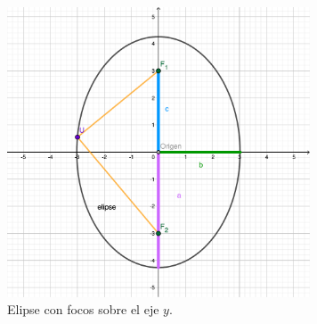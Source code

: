 \documentclass[letterpaper]{article}
\renewcommand{\*}{\cdot}
\theoremstyle{definition}
\begin{document}
	\begin{figure}[ht!]
		\centering
		\includegraphics[width=9cm]{Elipse}
		\caption{Elipse con focos sobre el eje $y$.}
		\label{F1}
	\end{figure}
	
	
\end{document}
